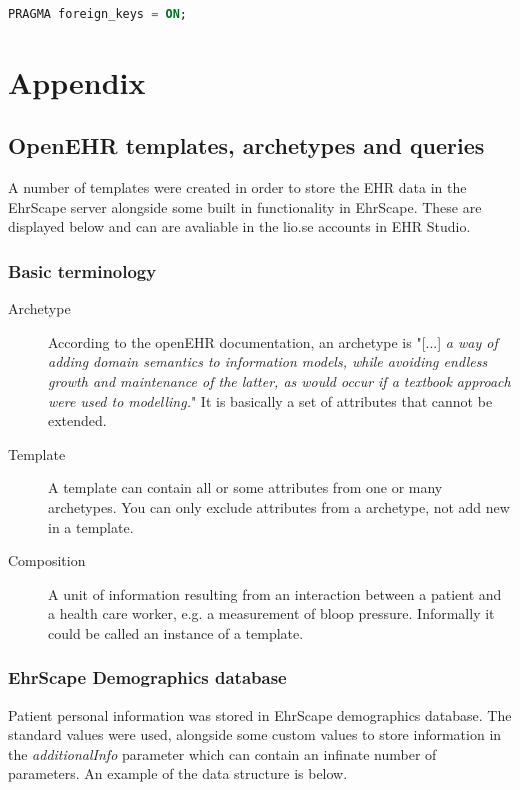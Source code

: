 \documentclass{article}
\begin{document}
\begin{lstlisting}[language = SQL]
PRAGMA foreign_keys = ON;
\end{lstlisting}








\clearpage
\section{Appendix}
\subsection{OpenEHR templates, archetypes and queries}\label{ehr-appendix}
A number of templates were created in order to store the EHR data in the EhrScape server alongside some built in functionality in EhrScape. These are displayed below and can are avaliable in the lio.se accounts in EHR Studio.

\subsubsection{Basic terminology}
\begin{description}
\item[Archetype] According to the openEHR documentation, an archetype is "[...] \emph{a way of adding domain semantics to information models, while avoiding endless growth and maintenance of the latter, as would occur if a textbook approach were used to modelling.}" It is basically a set of attributes that cannot be extended.
\item[Template] A template can contain all or some attributes from one or many archetypes. You can only exclude attributes from a archetype, not add new in a template.
\item[Composition] A unit of information resulting from an interaction between a patient and a health care worker, e.g. a measurement of bloop pressure. Informally it could be called an instance of a template.
\end{description}

\subsubsection{EhrScape Demographics database}
Patient personal information was stored in EhrScape demographics database. The standard values were used, alongside some custom values to store information in the \emph{additionalInfo} parameter which can contain an infinate number of parameters. An example of the data structure is below.
\end{document}
